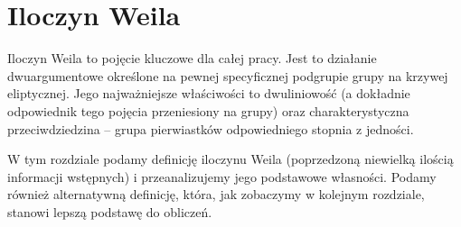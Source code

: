 \chapter{Iloczyn Weila}

Iloczyn Weila to pojęcie kluczowe dla całej pracy.
Jest to działanie dwuargumentowe
określone na pewnej specyficznej podgrupie grupy na krzywej eliptycznej.
Jego najważniejsze właściwości to dwuliniowość
(a dokładnie odpowiednik tego pojęcia przeniesiony na grupy)
oraz charakterystyczna przeciwdziedzina --
grupa pierwiastków odpowiedniego stopnia z jedności.

W tym rozdziale podamy definicję iloczynu Weila
(poprzedzoną niewielką ilością informacji wstępnych)
i przeanalizujemy jego podstawowe własności.
Podamy również alternatywną definicję, która,
jak zobaczymy w kolejnym rozdziale,
stanowi lepszą podstawę do obliczeń.






